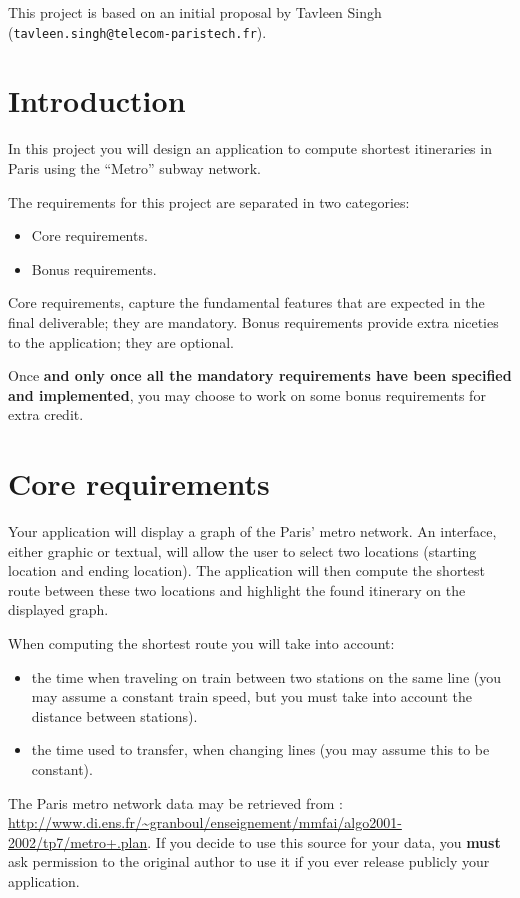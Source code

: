 \documentclass{exercices}
\renewcommand{\|}{\url|}
\begin{document}

This project is based on an initial proposal by Tavleen Singh
(\texttt{tavleen.singh@telecom-paristech.fr}).

\section{Introduction}

In this project you will design an application to compute shortest
itineraries in Paris using the ``Metro'' subway network.

The requirements for this project are separated in two categories:
\begin{itemize}
  \item Core requirements.
  \item Bonus requirements.
\end{itemize}

Core requirements, capture the fundamental features that are
expected in the final deliverable; they are mandatory.
Bonus requirements provide extra niceties to the application; they
are optional.

Once \textbf{and only once all the mandatory requirements have
been specified and implemented}, you may choose to work on some bonus
requirements for extra credit.

\section{Core requirements}

Your application will display a graph of the Paris' metro network.
An interface, either graphic or textual, will allow the user to select
two locations (starting location and ending location).
The application will then compute the shortest route between these two
locations and highlight the found itinerary on the displayed graph.

When computing the shortest route you will take into account:
\begin{itemize}
\item the time when traveling on train between two stations on the same line (you may assume a
  constant train speed, but you must take into account the distance between stations).
\item the time used to transfer, when changing lines (you may assume this to be
  constant).
\end{itemize}

The Paris metro network data may be retrieved from :
\url{http://www.di.ens.fr/~granboul/enseignement/mmfai/algo2001-2002/tp7/metro+.plan}.
If you decide to use this source for your data, you \textbf{must} ask permission
to the original author to use it if you ever release publicly your application.
\end{document}
